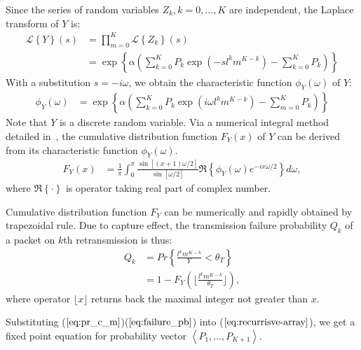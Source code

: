 Since the series of random variables $Z_k, k=0,..., K$ are independent, the Laplace transform of $Y$ is:
\begin{align*}
\mathcal{L} \left\lbrace Y \right\rbrace \left( s \right) 
&= \prod_{m=0}^{K}  \mathcal{L} \left\lbrace Z_k \right\rbrace \left( s \right) \\
&= \exp\left\lbrace \alpha \left( \sum_{k=0}^{K} P_k \exp(-sl^k m^{K-k})-\sum_{k=0}^{K}P_k\right)\right\rbrace
\end{align*}
With a substitution $s= -i\omega$, we obtain the characteristic function $\phi_{Y}\left( \omega \right)$ of $Y$:
\begin{align*}
\phi_{Y}\left( \omega \right) &= \exp\left\lbrace \alpha \left( \sum_{k=0}^{K} P_k \exp(i \omega l^k m^{K-k})-\sum_{m=0}^{K}P_k\right)\right\rbrace
\end{align*}
Note that $Y$ is a discrete random variable. Via a numerical integral method detailed in~\cite{nuttall1969numerical}, the cumulative distribution function $F_{Y}\left( x \right)$ of $Y$ can be derived from its characteristic function $\phi_{Y}\left( \omega \right)$.
\begin{align}
\label{eq:pr_c_m}
F_{Y}\left( x \right)  &= 	\frac{1}{\pi}\int_{0}^{\pi} \frac{\sin\left[ (x+1) \omega/2 \right] }{\sin\left[ \omega/2\right] } \Re\left\lbrace \phi_{Y}\left( \omega \right) e^{-ix\omega/2} \right\rbrace d\omega,
\end{align}
where $\Re\left\lbrace \cdot \right\rbrace$ is operator taking real part of complex number.

Cumulative distribution function $F_{Y}$ can be numerically and rapidly obtained by trapezoidal rule. Due to capture effect, the transmission failure probability $Q_k$ of a packet on $k$th retransmission is thus:
\begin{align}
\label{eq:failure_pb}
	Q_{k} &= Pr\left\lbrace \frac{l^k m^{K-k}}{Y} < \theta_{T}\right\rbrace \nonumber\\
	&= 1 - F_Y\left( \lfloor\frac{l^k m^{K-k}}{\theta_{T}}\rfloor \right),
\end{align}
where operator $\lfloor x \rfloor$ returns back the maximal integer not greater than $x$. 

Substituting ($\ref{eq:pr_c_m}$)($\ref{eq:failure_pb}$) into ($\ref{eq:recurrisve-array}$), we get a fixed point equation for probability vector $\left\langle P_1, ..., P_{K+1}\right\rangle$.  
